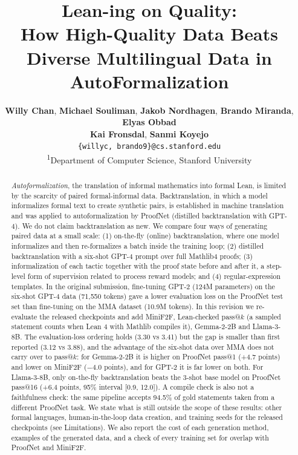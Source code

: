 \documentclass{article} %
\title{Lean-ing on Quality: \\ How High-Quality Data Beats Diverse Multilingual Data in AutoFormalization}
\author{%
  \textbf{Willy Chan}, \textbf{Michael Souliman}, \textbf{Jakob Nordhagen}, \textbf{Brando Miranda}, \textbf{Elyas Obbad}\\
  \textbf{Kai Fronsdal},
  \textbf{Sanmi Koyejo}\\
  \texttt{\{willyc, brando9\}@cs.stanford.edu} \\
  \textsuperscript{1}Department of Computer Science, Stanford University\\
}
\begin{document}
\maketitle

\begin{abstract}

\textit{Autoformalization}, the translation of informal mathematics into formal Lean, is limited by the scarcity of paired formal-informal data. Backtranslation, in which a model informalizes formal text to create synthetic pairs, is established in machine translation and was applied to autoformalization by ProofNet (distilled backtranslation with GPT-4). We do not claim backtranslation as new. We compare four ways of generating paired data at a small scale: (1) on-the-fly (online) backtranslation, where one model informalizes and then re-formalizes a batch inside the training loop; (2) distilled backtranslation with a six-shot GPT-4 prompt over full Mathlib4 proofs; (3) informalization of each tactic together with the proof state before and after it, a step-level form of supervision related to process reward models; and (4) regular-expression templates. In the original submission, fine-tuning GPT-2 (124M parameters) on the six-shot GPT-4 data (71,550 tokens) gave a lower evaluation loss on the ProofNet test set than fine-tuning on the MMA dataset (10.9M tokens). In this revision we re-evaluate the released checkpoints and add MiniF2F, Lean-checked pass@$k$ (a sampled statement counts when Lean 4 with Mathlib compiles it), Gemma-2-2B and Llama-3-8B. The evaluation-loss ordering holds (3.30 vs 3.41) but the gap is smaller than first reported (3.12 vs 3.88), and the advantage of the six-shot data over MMA does not carry over to pass@$k$: for Gemma-2-2B it is higher on ProofNet pass@1 (+4.7 points) and lower on MiniF2F ($-4.0$ points), and for GPT-2 it is far lower on both. For Llama-3-8B, only on-the-fly backtranslation beats the 3-shot base model on ProofNet pass@16 (+6.4 points, 95\% interval [0.9, 12.0]). A compile check is also not a faithfulness check: the same pipeline accepts 94.5\% of gold statements taken from a different ProofNet task. We state what is still outside the scope of these results: other formal languages, human-in-the-loop data creation, and training seeds for the released checkpoints (see Limitations). We also report the cost of each generation method, examples of the generated data, and a check of every training set for overlap with ProofNet and MiniF2F.
\end{abstract}
\end{document}
